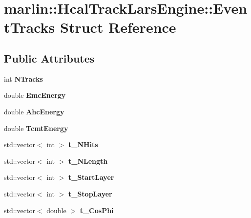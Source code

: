 \section{marlin::HcalTrackLarsEngine::EventTracks Struct Reference}
\label{structmarlin_1_1HcalTrackLarsEngine_1_1EventTracks}
\subsection*{Public Attributes}
\begin{DoxyCompactItemize}
\item 
int {\bfseries NTracks}\label{structmarlin_1_1HcalTrackLarsEngine_1_1EventTracks_ae87dbd7da4cc6dea1d5ea2d86033e302}

\item 
double {\bfseries EmcEnergy}\label{structmarlin_1_1HcalTrackLarsEngine_1_1EventTracks_a6a7cc3e2b797fac98b3cf316d1760175}

\item 
double {\bfseries AhcEnergy}\label{structmarlin_1_1HcalTrackLarsEngine_1_1EventTracks_a7e762ef4b89e12fb6b9930eb21aa0dc6}

\item 
double {\bfseries TcmtEnergy}\label{structmarlin_1_1HcalTrackLarsEngine_1_1EventTracks_a32a6dfc958c87cfe63e6ee1fe8eb3b94}

\item 
std::vector$<$ int $>$ {\bfseries t\_\-NHits}\label{structmarlin_1_1HcalTrackLarsEngine_1_1EventTracks_a17f7761dc8374a674603d7d63509741d}

\item 
std::vector$<$ int $>$ {\bfseries t\_\-NLength}\label{structmarlin_1_1HcalTrackLarsEngine_1_1EventTracks_ad1f9c691180d4349a10f7fc66083744e}

\item 
std::vector$<$ int $>$ {\bfseries t\_\-StartLayer}\label{structmarlin_1_1HcalTrackLarsEngine_1_1EventTracks_ab78dc8f8a90b65b1af9ce341a7a8901b}

\item 
std::vector$<$ int $>$ {\bfseries t\_\-StopLayer}\label{structmarlin_1_1HcalTrackLarsEngine_1_1EventTracks_afab02710e874a19cb735cfc761d0254c}

\item 
std::vector$<$ double $>$ {\bfseries t\_\-CosPhi}\label{structmarlin_1_1HcalTrackLarsEngine_1_1EventTracks_ade43ae36b4ba86a585af05a5300de2d2}


\end{DoxyCompactItemize}
